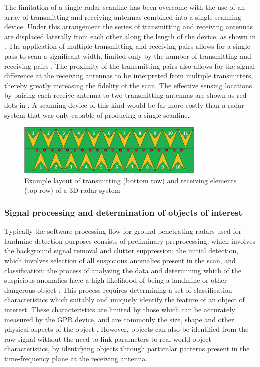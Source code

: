 \documentclass[main.tex]{subfiles}
\begin{document}
The limitation of a single radar scanline has been overcome with the use of an array of transmitting and receiving antennas combined into a single scanning device. Under this arrangement the series of transmitting and receiving antennas are displaced laterally from each other along the length of the device, as shown in . The application of multiple transmitting and receiving pairs allows for a single pass to scan a significant width, limited only by the number of transmitting and receiving pairs \parencite{3dradarDX}. The proximity of the transmitting pairs also allows for the signal difference at the receiving antennas to be interpreted from multiple transmitters, thereby greatly increasing the fidelity of the scan. The effective sensing locations by pairing each receive antenna to two transmitting antennas are shown as red dots in . A scanning device of this kind would be far more costly than a radar system that was only capable of producing a single scanline.

\begin{figure}[ht]
\centering
\includegraphics[width=0.8\textwidth]{3-LiteratureReview/3d-radar.png}
\caption[Example layout of transmitting and receiving elements of a 3D radar system]{Example layout of transmitting (bottom row) and receiving elements (top row) of a 3D radar system \parencite{3dradarDXG}}
\end{figure}

\subsubsection{Signal processing and determination of objects of interest}
Typically the software processing flow for ground penetrating radars used for landmine detection purposes consists of preliminary preprocessing, which involves the background signal removal and clutter suppression; the initial detection, which involves selection of all suspicious anomalies present in the scan, and classification; the process of analysing the data and determining which of the suspicious anomalies have a high likelihood of being a landmine or other dangerous object \parencite{Ho.etal2004}. This process requires determining a set of classification characteristics which suitably and uniquely identify the feature of an object of interest. These characteristics are limited by those which can be accurately measured by the GPR device, and are commonly the size, shape and other physical aspects of the object \parencite{Ho2008}. However, objects can also be identified from the raw signal without the need to link parameters to real-world object characteristics, by identifying objects through particular patterns present in the time-frequency plane at the receiving antenna.
\end{document}
